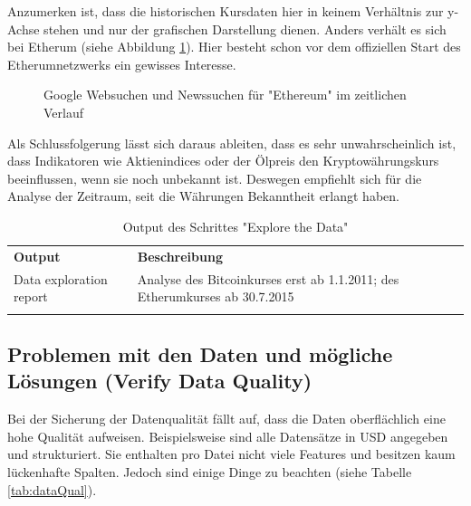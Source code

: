 Anzumerken ist, dass die historischen Kursdaten hier in keinem Verhältnis zur y-Achse stehen und nur der grafischen Darstellung dienen.
Anders verhält es sich bei Etherum (siehe Abbildung \ref{fig:PublicInterestETH}). Hier besteht schon vor dem offiziellen Start des Etherumnetzwerks\citep{tual_ethereum_2015} ein gewisses Interesse.
\begin{figure}[H]
\centering
{}
\caption{Google Websuchen und Newssuchen für "Ethereum" im zeitlichen Verlauf}
\label{fig:PublicInterestETH}
\end{figure}
Als Schlussfolgerung lässt sich daraus ableiten, dass es sehr unwahrscheinlich ist, dass Indikatoren wie Aktienindices oder der Ölpreis den Kryptowährungskurs beeinflussen, wenn sie noch unbekannt ist. Deswegen empfiehlt sich für die Analyse der Zeitraum, seit die Währungen Bekanntheit erlangt haben. 

\begin{centering} \begin{longtable}[H]{|p{}|p{12cm}|}
\hline
\textbf{Output} & \textbf{Beschreibung} \\ 
\hhline{==}
Data exploration report & Analyse des Bitcoinkurses erst ab 1.1.2011; des Etherumkurses ab 30.7.2015\\
\hline
\caption{Output des Schrittes "Explore the Data"}
\end{longtable} \end{centering}

\subsection*{Problemen mit den Daten und mögliche Lösungen (Verify Data Quality)}
Bei der Sicherung der Datenqualität fällt auf, dass die Daten oberflächlich eine hohe Qualität aufweisen. Beispielsweise sind alle Datensätze in USD angegeben und strukturiert. Sie enthalten pro Datei nicht viele Features und besitzen kaum lückenhafte Spalten. Jedoch sind einige Dinge zu beachten (siehe Tabelle \ref{tab:dataQual}).

